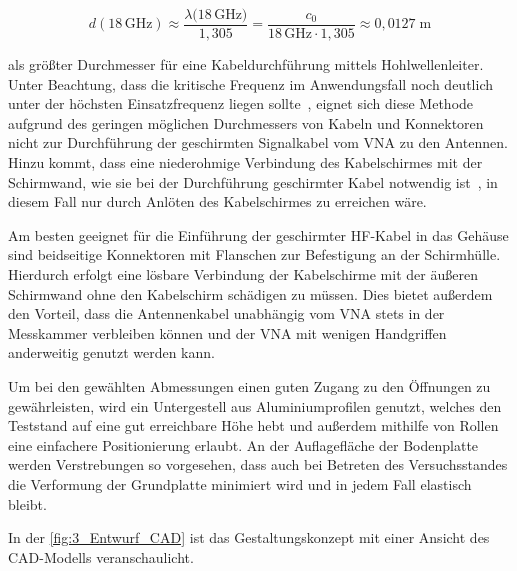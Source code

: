 \begin{equation}
    d(18\,\si{\giga\hertz}) \approx \frac{\lambda(18\,\si{\giga\hertz)}}{1,305} = \frac{c_0}{18\,\si{\giga\hertz}\cdot 1,305} \approx 0,0127 \; \si{\meter}
\end{equation}

als größter Durchmesser für eine Kabeldurchführung mittels Hohlwellenleiter. Unter Beachtung, dass die kritische Frequenz im Anwendungsfall noch deutlich unter der höchsten Einsatzfrequenz liegen sollte~\cite{EM_Schirmung}, eignet sich diese Methode aufgrund des geringen möglichen Durchmessers von Kabeln und Konnektoren nicht zur Durchführung der geschirmten Signalkabel vom \ac{VNA} zu den Antennen. Hinzu kommt, dass eine niederohmige Verbindung des Kabelschirmes mit der Schirmwand, wie sie bei der Durchführung geschirmter Kabel notwendig ist~\cite{EM_Schirmung, EMV}, in diesem Fall nur durch Anlöten des Kabelschirmes zu erreichen wäre.
\par
\vspace{\linespace}
Am besten geeignet für die Einführung der geschirmter HF-Kabel in das Gehäuse sind beidseitige Konnektoren mit Flanschen zur Befestigung an der Schirmhülle. Hierdurch erfolgt eine lösbare Verbindung der Kabelschirme mit der äußeren Schirmwand ohne den Kabelschirm schädigen zu müssen. Dies bietet außerdem den Vorteil, dass die Antennenkabel unabhängig vom \ac{VNA} stets in der Messkammer verbleiben können und der \ac{VNA} mit wenigen Handgriffen anderweitig genutzt werden kann. 
\par
\vspace{\linespace}
Um bei den gewählten Abmessungen einen guten Zugang zu den Öffnungen zu gewährleisten, wird ein Untergestell aus Aluminiumprofilen genutzt, welches den Teststand auf eine gut erreichbare Höhe hebt und außerdem mithilfe von Rollen eine einfachere Positionierung erlaubt. An der Auflagefläche der Bodenplatte werden Verstrebungen so vorgesehen, dass auch bei Betreten des Versuchsstandes die Verformung der Grundplatte minimiert wird und in jedem Fall elastisch bleibt.
\par
\vspace{\linespace}
In der \Abb\ref{fig:3_Entwurf_CAD} ist das Gestaltungskonzept mit einer Ansicht des CAD-Modells veranschaulicht. 
\par
\vspace{\linespace}\vspace{\linespace}


